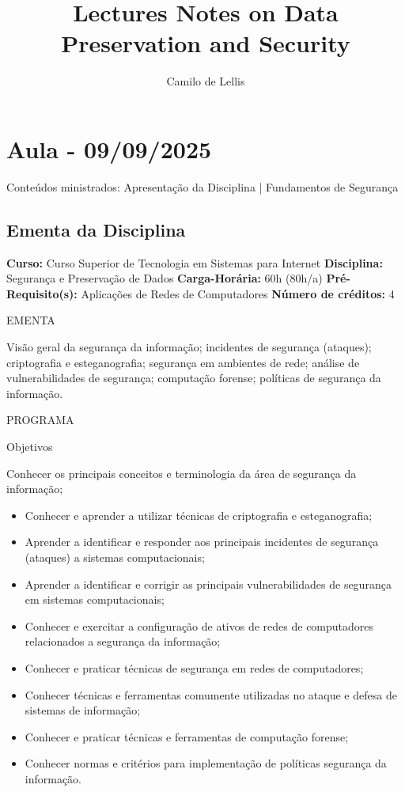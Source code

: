 \documentclass{article}
\title{Lectures Notes on Data Preservation and Security}
\author{Camilo de Lellis}
\begin{document}
\maketitle

\tableofcontents

\section{Aula - 09/09/2025}
Conteúdos ministrados: Apresentação da Disciplina | Fundamentos de Segurança

\subsection{Ementa da Disciplina}
\textbf{Curso:} Curso Superior de Tecnologia em Sistemas para Internet
\textbf{Disciplina:} Segurança e Preservação de Dados \textbf{Carga-Horária:} 60h (80h/a)
\textbf{Pré-Requisito(s):} Aplicações de Redes de Computadores  \textbf{Número de créditos:} 4

\begin{center}
EMENTA
\end{center}
Visão geral da segurança da informação; incidentes de segurança (ataques); criptografia e
esteganografia; segurança em ambientes de rede; análise de vulnerabilidades de segurança;
computação forense; políticas de segurança da informação.

\begin{center}
PROGRAMA
\end{center}

\begin{center}
Objetivos
\end{center}
Conhecer os principais conceitos e terminologia da área de segurança da informação;
\begin{itemize}
      \item Conhecer e aprender a utilizar técnicas de criptografia e esteganografia;
      \item Aprender a identificar e responder aos principais incidentes de segurança (ataques) a sistemas computacionais;
      \item Aprender a identificar e corrigir as principais vulnerabilidades de segurança em sistemas computacionais;
      \item Conhecer e exercitar a configuração de ativos de redes de computadores relacionados a segurança da informação;
      \item Conhecer e praticar técnicas de segurança em redes de computadores;
      \item Conhecer técnicas e ferramentas comumente utilizadas no ataque e defesa de sistemas de informação;
      \item Conhecer e praticar técnicas e ferramentas de computação forense;
      \item Conhecer normas e critérios para implementação de políticas segurança da informação.
\end{itemize}
\end{document}
